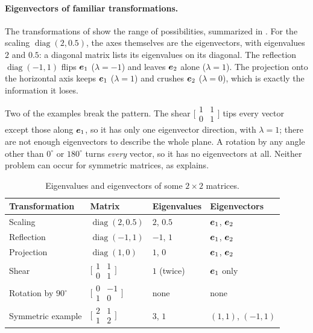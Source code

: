 \paragraph{Eigenvectors of familiar transformations.}
The transformations of  show the range of
possibilities, summarized in . For the
scaling $\operatorname{diag}(2, 0.5)$, the axes themselves are the
eigenvectors, with eigenvalues $2$ and $0.5$: a diagonal matrix lists its
eigenvalues on its diagonal. The reflection $\operatorname{diag}(-1, 1)$
flips $\bm{e}_1$ ($\lambda = -1$) and leaves $\bm{e}_2$ alone
($\lambda = 1$). The projection onto the horizontal axis keeps
$\bm{e}_1$ ($\lambda = 1$) and crushes $\bm{e}_2$ ($\lambda = 0$),
which is exactly the information it loses.

Two of the examples break the pattern. The shear
$\bigl[\begin{smallmatrix} 1 & 1 \\ 0 & 1 \end{smallmatrix}\bigr]$ tips every
vector except those along $\bm{e}_1$, so it has only one eigenvector
direction, with $\lambda = 1$; there are not enough eigenvectors to
describe the whole plane. A rotation by any angle other than $0^\circ$ or
$180^\circ$ turns \emph{every} vector, so it has no eigenvectors at all.
Neither problem can occur for symmetric matrices, as
 explains.

\begin{table}[ht]
  \centering
  \caption{Eigenvalues and eigenvectors of some $2 \times 2$ matrices.}
  \label{tab:ch04-eigen-examples}
  \begin{tabular}{@{}llll@{}}
    \toprule
    Transformation & Matrix & Eigenvalues & Eigenvectors \\
    \midrule
    Scaling & $\operatorname{diag}(2, 0.5)$ & $2$, $0.5$
      & $\bm{e}_1$, $\bm{e}_2$ \\
    Reflection & $\operatorname{diag}(-1, 1)$ & $-1$, $1$
      & $\bm{e}_1$, $\bm{e}_2$ \\
    Projection & $\operatorname{diag}(1, 0)$ & $1$, $0$
      & $\bm{e}_1$, $\bm{e}_2$ \\
    Shear & $\bigl[\begin{smallmatrix} 1 & 1 \\ 0 & 1
      \end{smallmatrix}\bigr]$ & $1$ (twice) & $\bm{e}_1$ only \\
    Rotation by $90^\circ$ & $\bigl[\begin{smallmatrix} 0 & -1 \\ 1 & 0
      \end{smallmatrix}\bigr]$ & none & none \\
    Symmetric example & $\bigl[\begin{smallmatrix} 2 & 1 \\ 1 & 2
      \end{smallmatrix}\bigr]$ & $3$, $1$ & $(1, 1)$, $(-1, 1)$ \\
    \bottomrule
  \end{tabular}
\end{table}

